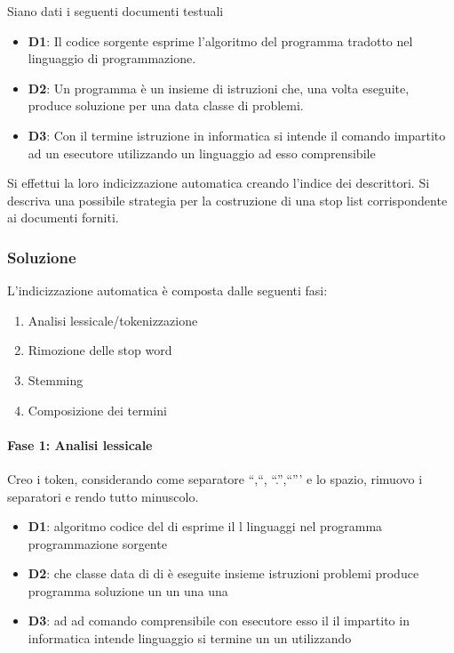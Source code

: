 Siano dati i seguenti documenti testuali

\begin{itemize}
	\item \textbf{D1}: Il codice sorgente esprime l'algoritmo del programma tradotto nel linguaggio di programmazione.
	\item \textbf{D2}: Un programma è un insieme di istruzioni che, una volta eseguite, produce soluzione per una data classe di problemi.
	\item \textbf{D3}: Con il termine istruzione in informatica si intende il comando impartito ad un esecutore utilizzando un linguaggio ad esso comprensibile
\end{itemize}

Si effettui la loro indicizzazione automatica creando l'indice dei descrittori. Si descriva una possibile strategia per la costruzione di una stop list corrispondente ai documenti forniti.

\subsubsection{Soluzione}

L'indicizzazione automatica è composta dalle seguenti fasi:
\begin{enumerate}
	\item Analisi lessicale/tokenizzazione
	\item Rimozione delle stop word
	\item Stemming
	\item Composizione dei termini
\end{enumerate}

\paragraph{Fase 1: Analisi lessicale}

Creo i token, considerando come separatore ``,``, ``.'',``''' e lo spazio, rimuovo i separatori e rendo tutto minuscolo.

\begin{itemize}
	\item \textbf{D1}: algoritmo codice del di esprime il l linguaggi nel programma programmazione sorgente
	\item \textbf{D2}: che classe data di di è eseguite insieme istruzioni problemi produce programma soluzione un un una una
	\item \textbf{D3}: ad ad comando comprensibile con esecutore esso il il impartito in informatica intende linguaggio si termine un un utilizzando  
\end{itemize}

